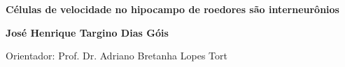 %
%

\begin{titlepage}

\begin{center}

\small



\vfill

\LARGE

\textbf{Células de velocidade no hipocampo de roedores são interneurônios}

\vfill

\Large

\textbf{José Henrique Targino Dias Góis}

\vfill

\normalsize

Orientador: Prof. Dr. Adriano Bretanha Lopes Tort


\end{center}
\end{titlepage}
